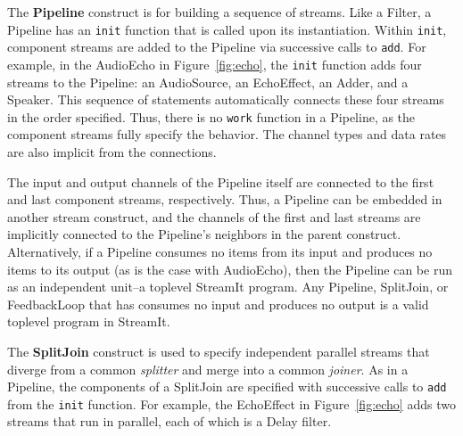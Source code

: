 The {\bf Pipeline} construct is for building a sequence of streams.
Like a Filter, a Pipeline has an {\tt init} function that is called
upon its instantiation.  Within {\tt init}, component streams are
added to the Pipeline via successive calls to {\tt add}.  For example,
in the AudioEcho in Figure~\ref{fig:echo}, the {\tt init} function
adds four streams to the Pipeline: an AudioSource, an EchoEffect, an
Adder, and a Speaker.  This sequence of statements automatically
connects these four streams in the order specified.  Thus, there is no
{\tt work} function in a Pipeline, as the component streams fully
specify the behavior.  The channel types and data rates are also
implicit from the connections.

The input and output channels of the Pipeline itself are connected to
the first and last component streams, respectively.  Thus, a Pipeline
can be embedded in another stream construct, and the channels of the
first and last streams are implicitly connected to the Pipeline's
neighbors in the parent construct.  Alternatively, if a Pipeline
consumes no items from its input and produces no items to its output
(as is the case with AudioEcho), then the Pipeline can be run as an
independent unit--a toplevel StreamIt program.  Any Pipeline,
SplitJoin, or FeedbackLoop that has consumes no input and produces no
output is a valid toplevel program in StreamIt.


%
The {\bf SplitJoin} construct is used to specify independent parallel
streams that diverge from a common {\it splitter} and merge into a
common {\it joiner}.  As in a Pipeline, the components of a SplitJoin
are specified with successive calls to {\tt add} from the {\tt init}
function.  For example, the EchoEffect in Figure~\ref{fig:echo} adds
two streams that run in parallel, each of which is a Delay filter.

